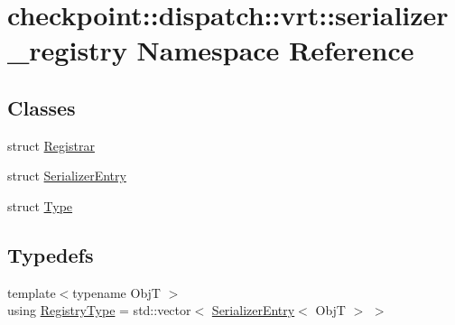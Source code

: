 \hypertarget{namespacecheckpoint_1_1dispatch_1_1vrt_1_1serializer__registry}{}\section{checkpoint\+:\+:dispatch\+:\+:vrt\+:\+:serializer\+\_\+registry Namespace Reference}
\label{namespacecheckpoint_1_1dispatch_1_1vrt_1_1serializer__registry}
\subsection*{Classes}
\begin{DoxyCompactItemize}
\item 
struct \hyperlink{structcheckpoint_1_1dispatch_1_1vrt_1_1serializer__registry_1_1_registrar}{Registrar}
\item 
struct \hyperlink{structcheckpoint_1_1dispatch_1_1vrt_1_1serializer__registry_1_1_serializer_entry}{Serializer\+Entry}
\item 
struct \hyperlink{structcheckpoint_1_1dispatch_1_1vrt_1_1serializer__registry_1_1_type}{Type}
\end{DoxyCompactItemize}
\subsection*{Typedefs}
\begin{DoxyCompactItemize}
\item 
{\footnotesize template$<$typename ObjT $>$ }\\using \hyperlink{namespacecheckpoint_1_1dispatch_1_1vrt_1_1serializer__registry_a93af9f3c271f2e1356cdaf8944831cc3}{Registry\+Type} = std\+::vector$<$ \hyperlink{structcheckpoint_1_1dispatch_1_1vrt_1_1serializer__registry_1_1_serializer_entry}{Serializer\+Entry}$<$ ObjT $>$ $>$
\end{DoxyCompactItemize}
